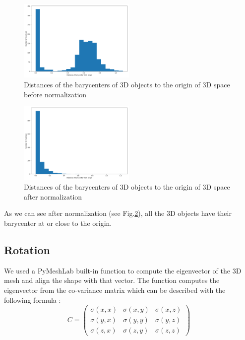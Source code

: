 \documentclass[10pt,twocolumn,letterpaper]{article}
\begin{document}
\begin{figure}[h!]
\begin{center}
  \includegraphics[width=0.5\textwidth]{picture/Initial barycenter}
  \caption{Distances of the barycenters of 3D objects to the origin of 3D space before normalization}
  \label{fig:barycenter-before}
  \end{center}
\end{figure}

\begin{figure}[h!]
\begin{center}
  \includegraphics[width=0.5\textwidth]{picture/Normalised barycenter}
  \caption{Distances of the barycenters of 3D objects to the origin of 3D space after normalization}
  \label{fig:barycenter-after}
  \end{center}
\end{figure}

As we can see after normalization (see Fig.\ref{fig:barycenter-after}),  all the 3D objects have their barycenter at or close to the origin.

\subsection{Rotation}

	We used a PyMeshLab built-in function to compute the eigenvector of the 3D mesh and align the shape with that vector. The function computes the eigenvector from the co-variance matrix which can be described  with the following formula :
	$$ C = \begin{pmatrix}
   \sigma(x,x) & \sigma(x,y) & \sigma(x,z) \\
   \sigma(y,x) & \sigma(y,y) & \sigma(y,z) \\
   \sigma(z,x) & \sigma(z,y) & \sigma(z,z)
\end{pmatrix} $$
\end{document}
